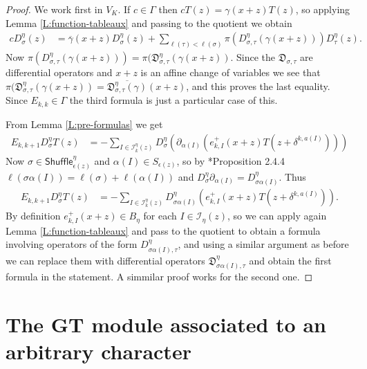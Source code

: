 \documentclass[11pt,fleqn]{article}
\newcommand\DD{\mathfrak D}
\newcommand\I{\mathcal I}
\newcommand\Shuffle{\mathsf{Shuffle}}
\begin{document}
\begin{proof}
We work first in $V_K$. If $c \in \Gamma$ then $c T(z) = \gamma(x+z) T(z)$, so
applying Lemma \ref{L:function-tableaux} and passing to the quotient we obtain
\begin{align*}
c D_\sigma^\eta(z)
	&= \overline \gamma(x+z) D_\sigma^\eta(z) +
		\sum_{\ell(\tau) < \ell(\sigma)} 
			\pi(D_{\sigma, \tau}^\eta(\gamma(x+z))) 
			D_\tau^\eta(z).
\end{align*}
Now $\pi(D_{\sigma, \tau}^\eta(\gamma(x+z))) = \pi(\DD_{\sigma,\tau}^\eta(
\gamma(x+z))$. Since the $\DD_{\sigma,\tau}$ are differential operators and
$x+z$ is an affine change of variables we see that $\pi(\DD_{\sigma,\tau}^\eta
(\gamma(x+z)) = \overline{\DD_{\sigma,\tau}^\eta(\gamma)}(x+z)$, and this 
proves the last equality. Since $E_{k,k} \in \Gamma$ the third formula is just 
a particular case of this.

From Lemma \ref{L:pre-formulas} we get
\begin{align*}
E_{k,k+1} D_\sigma^\eta T(z)
	&= - \sum_{I \in \I_k^\eta(z)} D_\sigma^\eta (\partial_{\alpha(I)} 
		\left(
			e_{k,I}^+(x+z) T(z + \delta^{k,a(I)})
		\right))
\end{align*}
Now $\sigma \in \Shuffle_{\epsilon(z)}^\eta$ and $\alpha(I) \in 
S_{\epsilon(z)}$, so by \cite{BB-coxeter-book}*{Proposition 2.4.4}
$\ell(\sigma \alpha(I)) = \ell(\sigma) + \ell(\alpha(I))$ and
$D_\sigma^\eta \partial_{\alpha(I)} = D^\eta_{\sigma \alpha(I)}$. Thus
\begin{align*}
E_{k,k+1} D_\sigma^\eta T(z)
	&= - \sum_{I \in \I_k^\eta(z)} D_{\sigma\alpha(I)}^\eta  
		\left(
			e_{k,I}^+(x+z) T(z + \delta^{k,a(I)})
		\right).
\end{align*}
By definition $e_{k,I}^+(x+z) \in B_\eta$ for each $I \in \I_\eta(z)$, so
we can apply again Lemma \ref{L:function-tableaux} and pass to the quotient
to obtain a formula involving operators of the form $D_{\sigma\alpha(I), 
\tau}^\eta$, and using a similar argument as before we can replace them with
differential operators $\DD_{\sigma\alpha(I), \tau}^\eta$ and obtain the 
first formula in the statement. A simmilar proof works for the second one.
\end{proof}

\section{The GT module associated to an arbitrary character}
\end{document}

